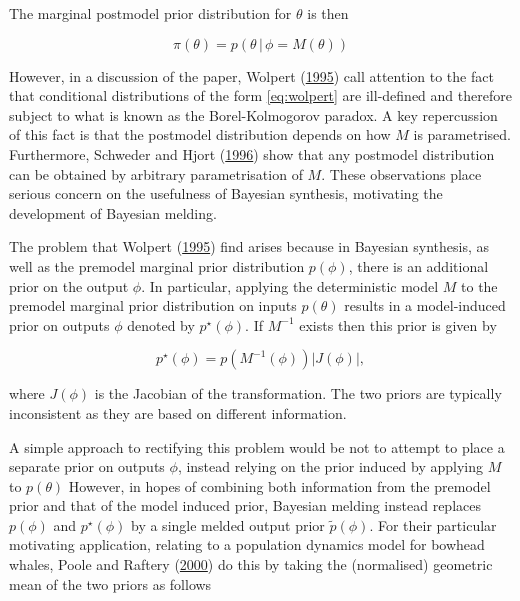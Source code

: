 \documentclass[11pt,]{book}
\begin{document}
The marginal postmodel prior distribution for \(\theta\) is then

\begin{equation}
\pi(\theta) = p(\theta \, | \, \phi = M(\theta)) \label{eq:wolpert}
\end{equation}

However, in a discussion of the paper, Wolpert
(\protect\hyperlink{ref-wolpert1995inference}{1995}) call attention to
the fact that conditional distributions of the form \eqref{eq:wolpert}
are ill-defined and therefore subject to what is known as the
Borel-Kolmogorov paradox. A key repercussion of this fact is that the
postmodel distribution depends on how \(M\) is parametrised.
Furthermore, Schweder and Hjort
(\protect\hyperlink{ref-schweder1996bayesian}{1996}) show that any
postmodel distribution can be obtained by arbitrary parametrisation of
\(M\). These observations place serious concern on the usefulness of
Bayesian synthesis, motivating the development of Bayesian melding.

The problem that Wolpert
(\protect\hyperlink{ref-wolpert1995inference}{1995}) find arises because
in Bayesian synthesis, as well as the premodel marginal prior
distribution \(p(\phi)\), there is an additional prior on the output
\(\phi\). In particular, applying the deterministic model \(M\) to the
premodel marginal prior distribution on inputs \(p(\theta)\) results in
a model-induced prior on outputs \(\phi\) denoted by \(p^\star(\phi)\).
If \(M^{-1}\) exists then this prior is given by

\begin{equation}
p^\star(\phi) = p(M^{-1}(\phi)) |J(\phi)|, \label{eq:transform}
\end{equation}

where \(J(\phi)\) is the Jacobian of the transformation. The two priors
are typically inconsistent as they are based on different information.

A simple approach to rectifying this problem would be not to attempt to
place a separate prior on outputs \(\phi\), instead relying on the prior
induced by applying \(M\) to \(p(\theta)\) However, in hopes of
combining both information from the premodel prior and that of the model
induced prior, Bayesian melding instead replaces \(p(\phi)\) and
\(p^\star(\phi)\) by a single melded output prior \(\tilde p(\phi)\).
For their particular motivating application, relating to a population
dynamics model for bowhead whales, Poole and Raftery
(\protect\hyperlink{ref-poole2000inference}{2000}) do this by taking the
(normalised) geometric mean of the two priors as follows
\end{document}

